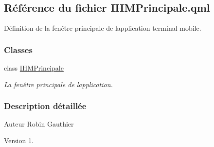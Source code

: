 \hypertarget{_i_h_m_principale_8qml}{}\subsection{Référence du fichier I\+H\+M\+Principale.\+qml}
\label{_i_h_m_principale_8qml}


Définition de la fenêtre principale de l\textquotesingle{}application terminal mobile.  


\subsubsection*{Classes}
\begin{DoxyCompactItemize}
\item 
class \hyperlink{class_i_h_m_principale}{I\+H\+M\+Principale}
\begin{DoxyCompactList}\small\item\em La fenêtre principale de l\textquotesingle{}application. \end{DoxyCompactList}\end{DoxyCompactItemize}


\subsubsection{Description détaillée}
\begin{DoxyAuthor}{Auteur}
Robin Gauthier
\end{DoxyAuthor}
\begin{DoxyVersion}{Version}
1. 
\end{DoxyVersion}
